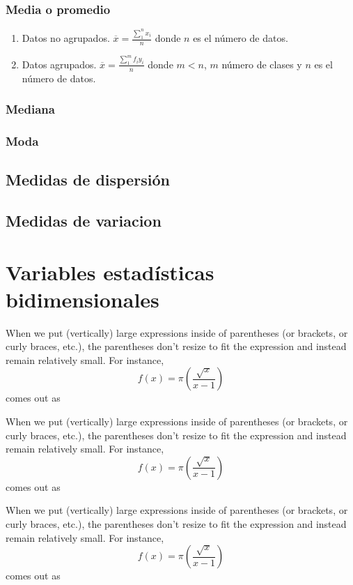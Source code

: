 \documentclass[a4paper]{report}
\begin{document}
\subsection{Media o promedio}
	\begin{enumerate}
		\item Datos no agrupados. $\overline{x}=\frac{\sum_1^nx_i}{n}$ donde $n$ es el número de datos.
		\item Datos agrupados.  $\overline{x}=\frac{\sum_1^mf_iy_i}{n}$ donde $m<n$, $m$ número de clases y $n$ es el número de datos.
 	\end{enumerate}

\subsection{Mediana}


\subsection{Moda}


\section{Medidas de dispersión}
\section{Medidas de variacion}



\chapter{Variables estadísticas bidimensionales}

When we put (vertically) large expressions inside of parentheses (or brackets, or curly braces, etc.), the parentheses don't resize to fit the expression and instead remain relatively small. For instance, $$f(x) = \pi(\frac{\sqrt{x}}{x-1})$$ comes out as

When we put (vertically) large expressions inside of parentheses (or brackets, or curly braces, etc.), the parentheses don't resize to fit the expression and instead remain relatively small. For instance, $$f(x) = \pi(\frac{\sqrt{x}}{x-1})$$ comes out as

When we put (vertically) large expressions inside of parentheses (or brackets, or curly braces, etc.), the parentheses don't resize to fit the expression and instead remain relatively small. For instance, $$f(x) = \pi(\frac{\sqrt{x}}{x-1})$$ comes out as
\end{document}
